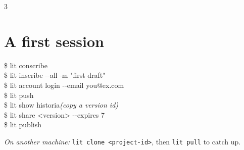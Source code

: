 \documentclass[9pt]{extarticle}
\newcommand{\ci}[1]{\texttt{#1}}                       %
\begin{document}
\begin{multicols}{3}
\section{A first session}
{\small\ttfamily
\$ lit conscribe\\
\$ lit inscribe -{}-all -m "first draft"\\
\$ lit account login -{}-email you@ex.com\\
\$ lit push\\
\$ lit show historia\quad\textrm{\itshape (copy a version id)}\\
\$ lit share <version> -{}-expires 7\\
\$ lit publish
}

\vspace{2pt}
\emph{On another machine:} \ci{lit clone <project-id>}, then
\ci{lit pull} to catch up.

\end{multicols}
\end{document}
